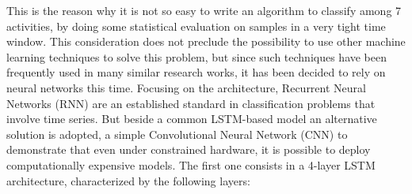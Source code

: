 This is the reason why it is not so easy to write an algorithm to classify among 7 activities, by doing some statistical evaluation on samples in a very tight time window. This consideration does not preclude the possibility to use other machine learning techniques to solve this problem, but since such techniques have been frequently used in many similar research works, it has been decided to rely on neural networks this time.\newline
Focusing on the architecture, Recurrent Neural Networks (RNN) are an established standard in classification problems that involve time series. But beside a common LSTM-based model  an alternative solution is adopted, a simple Convolutional Neural Network (CNN) to demonstrate that even under constrained hardware, it is possible to deploy computationally expensive models.\newline
The first one consists in a 4-layer LSTM architecture, characterized by the following layers:


